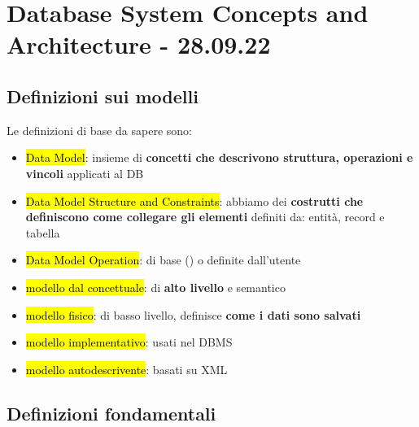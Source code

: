 
\section{Database System Concepts and Architecture - 28.09.22}

\subsection{Definizioni sui modelli}

Le definizioni di base da sapere sono:

\begin{itemize}
	\item \hl{Data Model}: insieme di \textbf{concetti che descrivono struttura, operazioni e vincoli} applicati al DB
	
	\item \hl{Data Model Structure and Constraints}: abbiamo dei \textbf{costrutti che definiscono come collegare gli elementi} definiti da: entità, record e tabella

	\item \hl{Data Model Operation}: di base () o definite dall'utente

	\item \hl{modello dal concettuale}: di \textbf{alto livello} e semantico
	
	\item \hl{modello fisico}: di basso livello, definisce \textbf{come i dati sono salvati}
	
	\item \hl{modello implementativo}: usati nel DBMS 
	
	\item \hl{modello autodescrivente}: basati su XML 

\end{itemize}


\subsection{Definizioni fondamentali}

